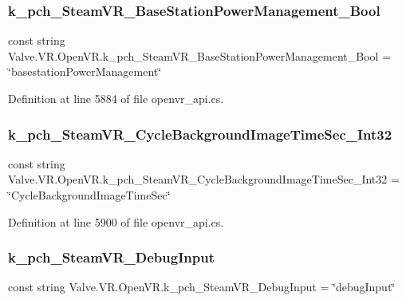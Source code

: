 \subsubsection{\texorpdfstring{k\_pch\_SteamVR\_BaseStationPowerManagement\_Bool}{k\_pch\_SteamVR\_BaseStationPowerManagement\_Bool}}
{\footnotesize\ttfamily const string Valve.\+V\+R.\+Open\+V\+R.\+k\+\_\+pch\+\_\+\+Steam\+V\+R\+\_\+\+Base\+Station\+Power\+Management\+\_\+\+Bool = \char`\"{}basestation\+Power\+Management\char`\"{}}



Definition at line 5884 of file openvr\+\_\+api.\+cs.

\mbox{\label{class_valve_1_1_v_r_1_1_open_v_r_a987a0154eb5626e58e4b4e912506779b}} 
\subsubsection{\texorpdfstring{k\_pch\_SteamVR\_CycleBackgroundImageTimeSec\_Int32}{k\_pch\_SteamVR\_CycleBackgroundImageTimeSec\_Int32}}
{\footnotesize\ttfamily const string Valve.\+V\+R.\+Open\+V\+R.\+k\+\_\+pch\+\_\+\+Steam\+V\+R\+\_\+\+Cycle\+Background\+Image\+Time\+Sec\+\_\+\+Int32 = \char`\"{}Cycle\+Background\+Image\+Time\+Sec\char`\"{}}



Definition at line 5900 of file openvr\+\_\+api.\+cs.

\mbox{\label{class_valve_1_1_v_r_1_1_open_v_r_ad87e25e3bb911dac602c99116dfb8aaa}} 
\subsubsection{\texorpdfstring{k\_pch\_SteamVR\_DebugInput}{k\_pch\_SteamVR\_DebugInput}}
{\footnotesize\ttfamily const string Valve.\+V\+R.\+Open\+V\+R.\+k\+\_\+pch\+\_\+\+Steam\+V\+R\+\_\+\+Debug\+Input = \char`\"{}debug\+Input\char`\"{}}



